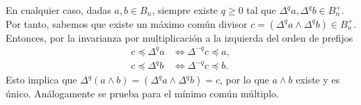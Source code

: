\documentclass[TFG.tex]{subfiles}
\begin{document}
En cualquier caso, dadas $a,b\in B_n$, siempre existe $q\geq 0$ tal que $\Delta^qa,\Delta^qb\in B_n^+$. Por tanto, sabemos que existe un máximo común divisor $c=(\Delta^qa\land\Delta^qb)\in B_n^+$. Entonces, por la invarianza por multiplicación a la izquierda del orden de prefijos
\begin{align*}
c\preccurlyeq \Delta^qa &\Leftrightarrow\Delta^{-q}c\preccurlyeq a,\\
c\preccurlyeq \Delta^qb &\Leftrightarrow\Delta^{-q}c\preccurlyeq b.
\end{align*}
Esto implica que $\Delta^q(a\land b)=(\Delta^q a\land \Delta^qb)=c$, por lo que $a\land b$ existe y es único. Análogamente se prueba para el mínimo común múltiplo.
\end{document}
